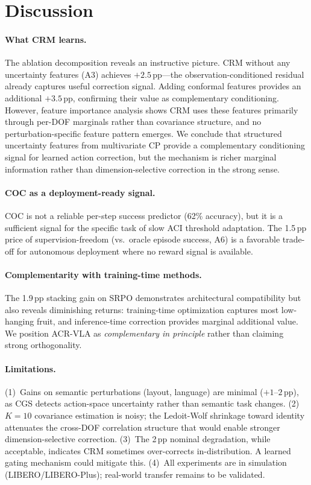 \documentclass[10pt,twocolumn]{article}
\begin{document}
\section{Discussion}
\label{sec:discussion}

\paragraph{What CRM learns.}
The ablation decomposition reveals an instructive picture.
CRM without any uncertainty features (A3) achieves $+2.5$\,pp---the observation-conditioned residual already captures useful correction signal.
Adding conformal features provides an additional $+3.5$\,pp, confirming their value as complementary conditioning.
However, feature importance analysis shows CRM uses these features primarily through per-DOF marginals rather than covariance structure, and no perturbation-specific feature pattern emerges.
We conclude that structured uncertainty features from multivariate CP provide a complementary conditioning signal for learned action correction, but the mechanism is richer marginal information rather than dimension-selective correction in the strong sense.

\paragraph{COC as a deployment-ready signal.}
COC is not a reliable per-step success predictor (62\% accuracy), but it is a sufficient signal for the specific task of slow ACI threshold adaptation.
The 1.5\,pp price of supervision-freedom (vs.\ oracle episode success, A6) is a favorable trade-off for autonomous deployment where no reward signal is available.

\paragraph{Complementarity with training-time methods.}
The 1.9\,pp stacking gain on SRPO demonstrates architectural compatibility but also reveals diminishing returns: training-time optimization captures most low-hanging fruit, and inference-time correction provides marginal additional value.
We position ACR-VLA as \emph{complementary in principle} rather than claiming strong orthogonality.

\paragraph{Limitations.}
(1)~Gains on semantic perturbations (layout, language) are minimal ($+1$--$2$\,pp), as CGS detects action-space uncertainty rather than semantic task changes.
(2)~$K{=}10$ covariance estimation is noisy; the Ledoit-Wolf shrinkage toward identity attenuates the cross-DOF correlation structure that would enable stronger dimension-selective correction.
(3)~The 2\,pp nominal degradation, while acceptable, indicates CRM sometimes over-corrects in-distribution.
A learned gating mechanism could mitigate this.
(4)~All experiments are in simulation (LIBERO/LIBERO-Plus); real-world transfer remains to be validated.
\end{document}
